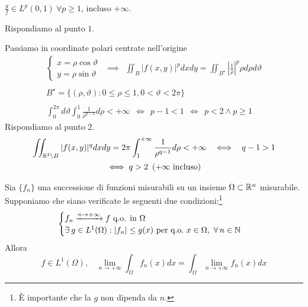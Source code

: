 $\frac{g}{f} \in L^{p}(0,1) \ \forall p\geq 1$, incluso $ + \infty $.
\Soluzione

Rispondiamo al punto $1$.

Passiamo in coordinate polari centrate nell'origine
\begin{gather*}
\begin{cases}
x = \rho \cos \vartheta \\
y = \rho \sin \vartheta 
\end{cases} \ \ \implies \ \ \iint _{B}| f(x,y)| ^{p} dxdy = \iint _{B^{\star }}\left| \frac{1}{\rho }\right| ^{p} \rho d\rho d\vartheta \\
\\
B^{\star } = \{(\rho ,\vartheta) :0\leq \rho \leq 1,0 < \vartheta < 2\pi \}\\
\\
\int ^{2\pi }_{0} d\vartheta \int ^{1}_{0}\frac{1}{\rho ^{p - 1}} d\rho < + \infty \ \ \iff \ \ p - 1 < 1\ \ \iff \ \ p < 2\land p\geq 1
\end{gather*}
Rispondiamo al punto $2$.
\begin{gather*}
\iint _{\mathbb{R} ^{2} \setminus B}| f(x,y)| ^{q} dxdy = 2\pi \int ^{ + \infty }_{1}\frac{1}{\rho ^{q - 1}} d\rho < + \infty \ \ \iff \ \ q - 1 > 1\\
\iff q > 2\ \left(+ \infty \ \text{incluso}\right)
\end{gather*}
\Soluzione
\begin{thm}
 Sia $\{f_{n}\}$ una successione di funzioni misurabili su un insieme $\Omega \subset \mathbb{R} ^{n}$ misurabile. Supponiamo che siano verificate le seguenti due condizioni:\footnote{È importante che la $g$ non dipenda da $n$.}
\begin{equation*}
\begin{cases}
f_{n}\xrightarrow{n\rightarrow + \infty } f\ \text{q.o. in} \ \Omega \\
\exists g\in L^{1}(\Omega) :| f_{n}| \leq g(x) \ \text{per q.o.} \ x\in \Omega ,\ \forall n\in \NN 
\end{cases}
\end{equation*}
Allora
\begin{equation*}
f\in L^{1}(\Omega) ,\ \ \ \ \lim _{n\rightarrow + \infty }\int _{\Omega } f_{n}(x) dx = \int _{\Omega }\lim _{n\rightarrow + \infty } f_{n}(x) dx
\end{equation*}
\end{thm}
